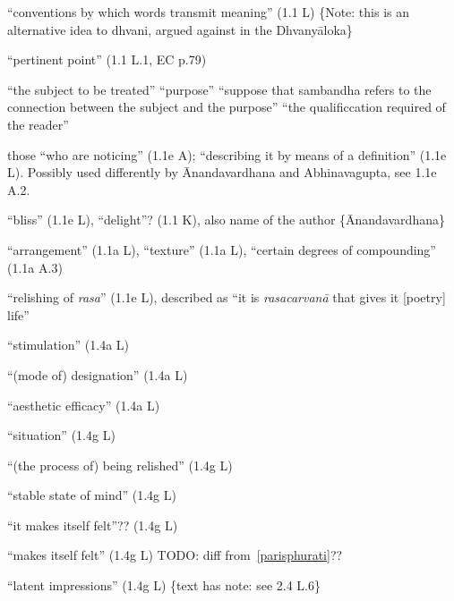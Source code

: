 \documentclass[10pt]{article}
\begin{document}
\begin{multicols}{2}
\begin{enumerate}
		  ``conventions by which words transmit meaning'' (1.1 L) \{Note: this is an alternative idea to dhvani, argued against in the Dhvanyāloka\}

		 ``pertinent point'' (1.1 L.1, EC p.79)
		\begin{enumerate}
			 ``the subject to be treated''
			 ``purpose''
			 ``suppose that sambandha refers to the connection between the subject and the purpose''
			 ``the qualificcation required of the reader''
		\end{enumerate}

		 those ``who are noticing'' (1.1e A); ``describing it by means of a definition'' (1.1e L). Possibly used differently by Ānandavardhana and Abhinavagupta, see 1.1e A.2.

		 ``bliss'' (1.1e L), ``delight''? (1.1 K), also name of the author \{Ānandavardhana\}

		 ``arrangement'' (1.1a L), ``texture'' (1.1a L), ``certain degrees of compounding'' (1.1a A.3)




		 ``relishing of \textit{rasa}'' (1.1e L),
		described as ``it is \textit{rasacarvanā} that gives it [poetry] life''




		 ``stimulation'' (1.4a L)

		 ``(mode of) designation'' (1.4a L)

		 ``aesthetic efficacy'' (1.4a L)

		 ``situation'' (1.4g L)

		 ``(the process of) being relished'' (1.4g L)

		 ``stable state of mind'' (1.4g L)

		 ``it makes itself felt''?? (1.4g L)

		 ``makes itself felt'' (1.4g L) TODO: diff from~\ref{parisphurati}??

		 ``latent impressions'' (1.4g L) \{text has note: see 2.4 L.6\}



	\end{enumerate}
\end{multicols}
\end{document}
